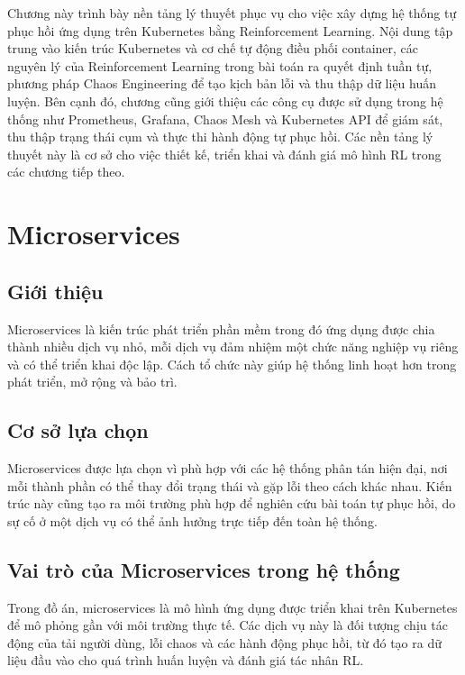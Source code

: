 Chương này trình bày nền tảng lý thuyết phục vụ cho việc xây dựng 
hệ thống tự phục hồi ứng dụng trên Kubernetes bằng Reinforcement 
Learning. Nội dung tập trung vào kiến trúc Kubernetes và 
cơ chế tự động điều phối container, các nguyên lý của Reinforcement 
Learning trong bài toán ra quyết định tuần tự, phương pháp Chaos 
Engineering để tạo kịch bản lỗi và thu thập dữ liệu huấn luyện. 
Bên cạnh đó, chương cũng giới thiệu các công cụ được sử dụng trong hệ thống như 
Prometheus, Grafana, Chaos Mesh và Kubernetes API để giám sát, thu thập 
trạng thái cụm và thực thi hành động tự phục hồi. 
Các nền tảng lý thuyết này là cơ sở cho việc thiết kế, triển khai và 
đánh giá mô hình RL trong các chương tiếp theo.
\section{Microservices}

\subsection{Giới thiệu}

Microservices là kiến trúc phát triển phần mềm trong đó ứng dụng được chia thành nhiều dịch vụ nhỏ, mỗi dịch vụ đảm nhiệm một chức năng nghiệp vụ riêng và có thể triển khai độc lập. Cách tổ chức này giúp hệ thống linh hoạt hơn trong phát triển, mở rộng và bảo trì.

\subsection{Cơ sở lựa chọn}

Microservices được lựa chọn vì phù hợp với các hệ thống phân tán hiện đại, nơi mỗi thành phần có thể thay đổi trạng thái và gặp lỗi theo cách khác nhau. Kiến trúc này cũng tạo ra môi trường phù hợp để nghiên cứu bài toán tự phục hồi, do sự cố ở một dịch vụ có thể ảnh hưởng trực tiếp đến toàn hệ thống.

\subsection{Vai trò của Microservices trong hệ thống}

Trong đồ án, microservices là mô hình ứng dụng được triển khai trên Kubernetes để mô phỏng gần với môi trường thực tế. Các dịch vụ này là đối tượng chịu tác động của tải người dùng, lỗi chaos và các hành động phục hồi, từ đó tạo ra dữ liệu đầu vào cho quá trình huấn luyện và đánh giá tác nhân RL.


